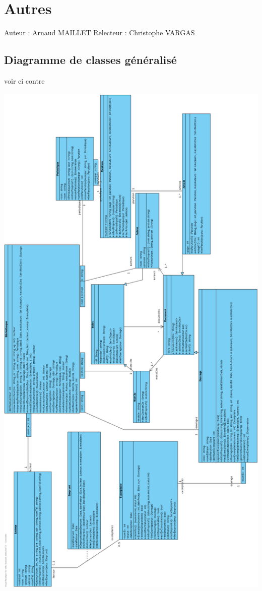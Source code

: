 \documentclass[a4paper,10pt]{report}
\begin{document}
\newpage

\chapter*{Autres}

Auteur : Arnaud MAILLET
Relecteur : Christophe VARGAS

\bigskip

\section*{Diagramme de classes généralisé}
\bigskip
\bigskip
\begin{center}
voir ci contre
\end{center}
\includegraphics[height=260mm]{diagrammeDeClasseGeneralise.png}
\end{document}
